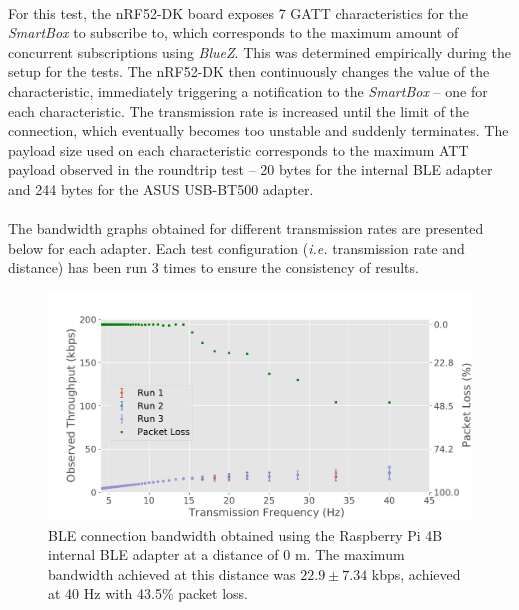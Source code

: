 \paragraph{} For this test, the nRF52-DK board exposes 7 \acs{GATT} characteristics for the \textit{SmartBox} to subscribe to, which corresponds to the maximum amount of concurrent subscriptions using \textit{BlueZ}. This was determined empirically during the setup for the tests. The nRF52-DK then continuously changes the value of the characteristic, immediately triggering a notification to the \textit{SmartBox} -- one for each characteristic. The transmission rate is increased until the limit of the connection, which eventually becomes too unstable and suddenly terminates. The payload size used on each characteristic corresponds to the maximum \acs{ATT} payload observed in the roundtrip test -- 20 bytes for the internal \acs{BLE} adapter and 244 bytes for the ASUS USB-BT500 adapter.

\paragraph{} The bandwidth graphs obtained for different transmission rates are presented below for each adapter. Each test configuration (\textit{i.e.} transmission rate and distance) has been run 3 times to ensure the consistency of results.

\begin{figure}[H]
    \centering
    \includegraphics[width=0.9\linewidth]{images/ble-bandwidth-hci1-0cm.pdf}
    \caption[\acs{BLE} connection bandwidth obtained using the ASUS USB-BT500 adapter at a distance of 0 m.]
    {\acs{BLE} connection bandwidth obtained using the Raspberry Pi 4B internal \acs{BLE} adapter at a distance of $0\text{ m}$. The maximum bandwidth achieved at this distance was $22.9 \pm 7.34$ kbps, achieved at 40 Hz with 43.5\% packet loss.}
    \label{fig:ble-bandwidth-hci1-0m}
\end{figure}

